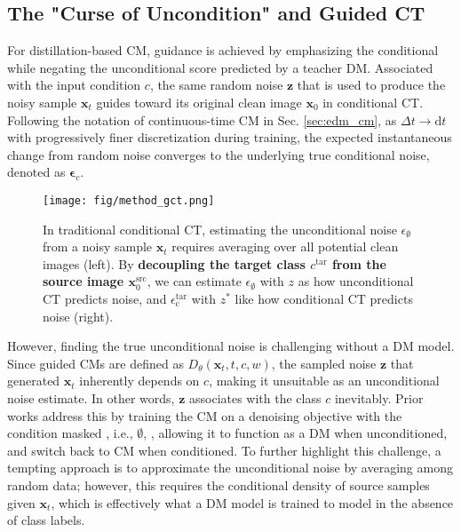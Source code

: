 \vspace{-0.3cm}
\subsection{The "Curse of Uncondition" and Guided CT}
\label{sec:method-gct}
\vspace{-0.15cm}

For distillation-based CM, guidance is achieved by emphasizing the conditional while negating the unconditional score predicted by a teacher DM. Associated with the input condition \(c\), the same random noise \(\boldsymbol{z}\) that is used to produce the noisy sample \(\boldsymbol{x}_t\) guides toward its original clean image \(\boldsymbol{x}_0\) in conditional CT. Following the notation of continuous-time CM in Sec. \ref{sec:edm_cm}, as \(\Delta t \rightarrow \text{d}t\) with progressively finer discretization during training, the expected instantaneous change from random noise converges to the underlying true conditional noise, denoted as \(\boldsymbol{\epsilon}_{c}\).

\begin{figure}[t!]  
    \centering
    \texttt{[image: fig/method\_gct.png]} 
    \vspace{-1.2em}
    \caption{In traditional conditional CT, estimating the unconditional noise \(\epsilon_{\emptyset}\) from a noisy sample \(\boldsymbol{x}_t\) requires averaging over all potential clean images (left). By \textbf{decoupling the target class \(c^\text{tar}\) from the source image \(\boldsymbol{x}_0^{\text{src}}\)}, we can estimate \(\epsilon_{\emptyset}\) with \(z\) as how unconditional CT predicts noise, and \(\epsilon_{\text{c}}^{\text{tar}}\) with \(z^*\) like how conditional CT predicts noise (right).}
    \vspace{-1.2em}
    \label{fig:method_gct}  %
\end{figure}

However, finding the true unconditional noise is challenging without a DM model. Since guided CMs are defined as \(D_\theta(\boldsymbol{x}_t, t, c, w)\), the sampled noise \(\boldsymbol{z}\) that generated \(\boldsymbol{x}_t\) inherently depends on \(c\), making it unsuitable as an unconditional noise estimate. In other words, \(\boldsymbol{z}\) associates with the class \(c\) inevitably. Prior works address this by training the CM on a denoising objective with the condition masked \cite{hu2024efficienttextdrivenmotiongeneration}, i.e., \(\emptyset\), , allowing it to function as a DM when unconditioned, and switch back to CM when conditioned. To further highlight this challenge, a tempting approach is to approximate the unconditional noise by averaging among random data; however, this requires the conditional density of source samples given \(\boldsymbol{x}_t\), which is effectively what a DM model is trained to model in the absence of class labels.

